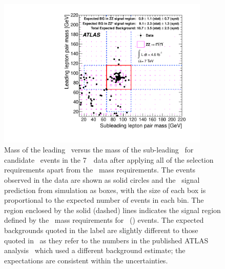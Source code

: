  \begin{figure}[htbp]
 \begin{center}
  \includegraphics[width=0.9\textwidth]{7TeV/h_mz1_mz2.pdf}\hfill
  \caption[Mass of the leading \leppair\ versus the mass of the
  sub-leading \leppair\ for candidate \ZZ\ events in the 7~\tev\ data.]
  {\small Mass of the leading \leppair\ versus the mass of the
  sub-leading \leppair\ for candidate \ZZ\ events in the 7~\tev\ data after
  applying all of the selection
  requirements apart from the \dilepton\ mass requirements.
  The events observed in the data are shown as solid circles and the \ZZsllll\
  signal prediction from simulation as boxes,
  with the size of each box is proportional to the expected number of events in each bin.  
  The region enclosed by the solid (dashed) lines indicates the signal region defined by the
  \dilepton\ mass requirements for \ZZ\ (\ZZs) events. The expected backgrounds
  quoted in the label are slightly different to those quoted
  in~ as they refer to the numbers in the published ATLAS
  analysis~\cite{ATLAS:2012kg} which used a different background estimate; the
  expectations are consistent within the uncertainties.
   }
    \label{fig:zzdists-Zmass2D-seven}
 \end{center}
 \end{figure}

